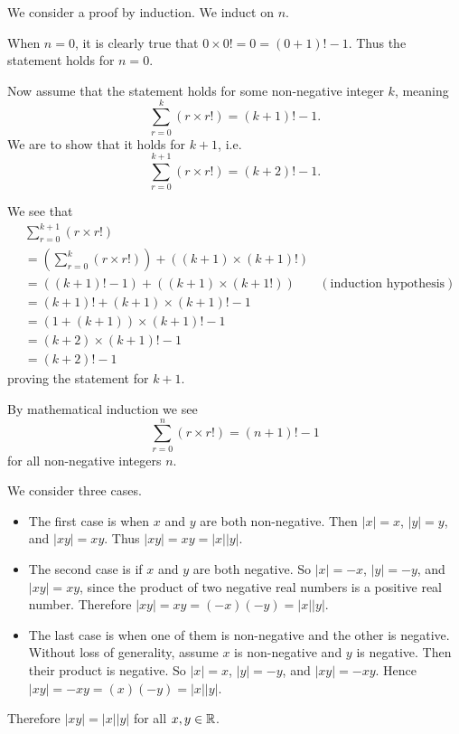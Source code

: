 \begin{questions}
    \item We consider a proof by induction. We induct on $n$.

    When $n = 0$, it is clearly true that $0 \times 0! = 0 = (0+1)! - 1$. Thus the statement holds for $n = 0$.

    Now assume that the statement holds for some non-negative integer $k$, meaning
    \[
        \sum_{r=0}^k (r\times r!) = (k+1)! - 1.
    \]
    We are to show that it holds for $k+1$, i.e.
    \[
        \sum_{r=0}^{k+1} (r\times r!) = (k+2)! - 1.
    \]

    We see that
    \begin{align*}
        &\sum_{r=0}^{k+1} (r\times r!)\\
        &= \left(\sum_{r=0}^k (r\times r!)\right) + ((k+1) \times (k+1)!)\\
        &= ((k+1)! - 1) + ((k+1) \times (k+1!)) & (\text{induction hypothesis})\\
        &= (k+1)! + (k+1) \times (k+1)! - 1\\
        &= (1 + (k+1))\times(k+1)! - 1\\
        &= (k+2) \times (k+1)! - 1\\
        &= (k+2)! - 1
    \end{align*}
    proving the statement for $k + 1$.

    By mathematical induction we see
    \[
        \sum_{r=0}^n (r\times r!) = (n+1)! - 1
    \]
    for all non-negative integers $n$.

    \item \begin{partquestions}{\roman*}
        \item We consider three cases.
        \begin{itemize}
            \item The first case is when $x$ and $y$ are both non-negative. Then $|x| = x$, $|y| = y$, and $|xy| = xy$. Thus $|xy| = xy = |x||y|$.
            \item The second case is if $x$ and $y$ are both negative. So $|x| = -x$, $|y| = -y$, and $|xy| = xy$, since the product of two negative real numbers is a positive real number. Therefore $|xy| = xy = (-x)(-y) = |x||y|$.
            \item The last case is when one of them is non-negative and the other is negative. Without loss of generality, assume $x$ is non-negative and $y$ is negative. Then their product is negative. So $|x| = x$, $|y| = -y$, and $|xy| = -xy$. Hence $|xy| = -xy = (x)(-y) = |x||y|$.
        \end{itemize}
        Therefore $|xy| = |x||y|$ for all $x, y \in \mathbb{R}$.


\end{partquestions}
\end{questions}
